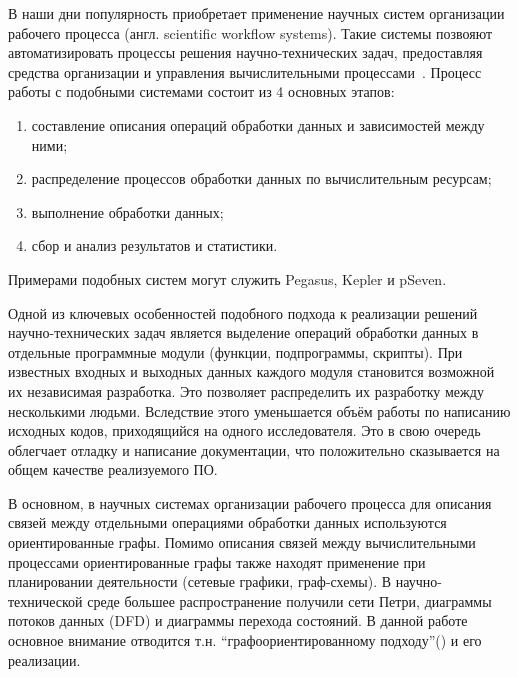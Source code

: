 В наши дни популярность приобретает применение научных систем организации рабочего процесса (англ. scientific workflow systems). Такие системы позвояют автоматизировать процессы решения научно-технических задач, предоставляя средства организации и управления вычислительными процессами~\cite{DeelmanWorkflow2009}. Процесс работы с подобными системами состоит из 4 основных этапов:
\begin{enumerate}
    \item составление описания операций обработки данных и зависимостей между ними;
    \item распределение процессов обработки данных по вычислительным ресурсам;
    \item выполнение обработки данных;
    \item сбор и анализ результатов и статистики.
\end{enumerate}

Примерами подобных систем могут служить Pegasus\cite{DeelmanPegasus2016}, Kepler\cite{AltintasKepler2004} и pSeven\cite{NazarenkoDFM2015}.

Одной из ключевых особенностей подобного подхода к реализации решений научно-технических задач является выделение операций обработки данных в отдельные программные модули (функции, подпрограммы, скрипты). При известных входных и выходных данных каждого модуля становится возможной их независимая разработка\cite{DanilovPar2011}. Это позволяет распределить их разработку между несколькими людьми. Вследствие этого уменьшается объём работы по написанию исходных кодов, приходящийся на одного исследователя. Это в свою очередь облегчает отладку и написание документации, что положительно сказывается на общем качестве реализуемого ПО.

В основном, в научных системах организации рабочего процесса для описания связей между отдельными операциями обработки данных используются ориентированные графы. Помимо описания связей между вычислительными процессами ориентированные графы также находят применение при планировании деятельности (сетевые графики, граф-схемы). В научно-технической среде большее распространение получили сети Петри, диаграммы потоков данных (DFD) и диаграммы перехода состояний. В данной работе основное внимание отводится т.н. ``графоориентированному подходу''()\cite{SokolovPershin2018} и его реализации.
